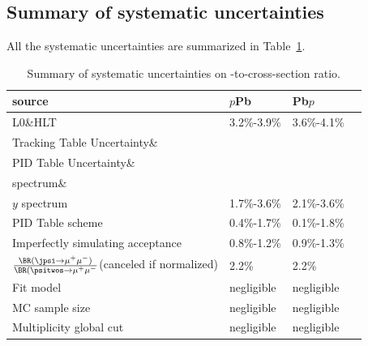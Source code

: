 \subsection{Summary of systematic uncertainties}
All the systematic uncertainties are summarized in Table~\ref{AllSysErr}.
\begin{table}[H]
\caption{Summary of systematic uncertainties on \psitwos-to-\jpsi cross-section ratio.}
\begin{center}
\begin{tabular}{llll}
\hline
\textbf{source} & \textbf{$p$Pb} & \textbf{Pb$p$} \\
\hline
L0\&HLT & 3.2\%-3.9\% & 3.6\%-4.1\% \\
\hline
	Tracking Table Uncertainty\& & & \\
	PID Table Uncertainty\& & & \\
	\pt spectrum\& & & \\
	$y$ spectrum & 1.7\%-3.6\% & 2.1\%-3.6\% \\
\hline
	PID Table scheme & 0.4\%-1.7\% & 0.1\%-1.8\% \\
\hline
	Imperfectly simulating acceptance & 0.8\%-1.2\% & 0.9\%-1.3\% \\
\hline
	$\frac{\BR(\jpsi\rightarrow\mu^+\mu^-)}{\BR(\psitwos\rightarrow\mu^+\mu^-}$(canceled if normalized) & 2.2\% &2.2\% \\
\hline
	Fit model & negligible & negligible \\
\hline
	MC sample size & negligible & negligible \\
\hline
	Multiplicity global cut & negligible & negligible \\
\hline
\end{tabular}
\label{AllSysErr}
\end{center}
\end{table}

